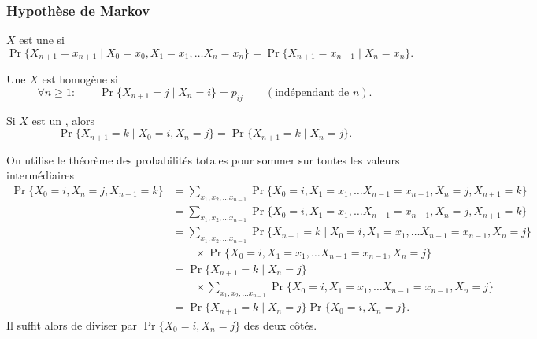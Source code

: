 \subsubsection{Hypothèse de Markov}

\begin{definition}[\CM]
  $X$ est une \cM si
  $$
  \Pr\{X_{n+1} = x_{n+1} \mid X_0 = x_0, X_1 = x_1, \dots X_n = x_n\} 
  = 
  \Pr\{X_{n+1} = x_{n+1} \mid X_n = x_n\}.
  $$
\end{definition}

\begin{definition}[\CM homogène]
  Une \cM $X$ est homogène si
  $$
  \forall n \geq 1: \qquad 
  \Pr\{X_{n+1} = j \mid X_n = i\} = p_{ij} 
  \qquad (\text{indépendant de $n$}).
  $$
\end{definition}

\begin{proposition} \label{prop:loiConditionnalleEtatInitial}
  Si $X$ est un \cM, alors
  $$
  \Pr\{X_{n+1} = k \mid X_0 = i, X_n = j\} 
  = 
  \Pr\{X_{n+1} = k \mid X_n = j\}.
  $$
\end{proposition}

\proof
On utilise le théorème des probabilités totales pour sommer sur toutes les valeurs intermédiaires
  \begin{align*}
    \Pr\{X_0 = i, X_n = j, X_{n+1} = k\}
    & = \sum_{x_1, x_2, \dots x_{n-1}}
    \Pr\{X_0 = i, X_1 = x_1, \dots X_{n-1} = x_{n-1}, X_n = j, X_{n+1} = k\} \\
    & = \sum_{x_1, x_2, \dots x_{n-1}}
    \Pr\{X_0 = i, X_1 = x_1, \dots X_{n-1} = x_{n-1}, X_n = j, X_{n+1} = k\} \\
    & = \sum_{x_1, x_2, \dots x_{n-1}}
    \Pr\{X_{n+1} = k \mid X_0 = i, X_1 = x_1, \dots X_{n-1} = x_{n-1}, X_n = j\} \\
    & \qquad \times \Pr\{X_0 = i, X_1 = x_1, \dots X_{n-1} = x_{n-1}, X_n = j\} \\
    & = \Pr\{X_{n+1} = k \mid X_n = j\} \\
    & \qquad \times \sum_{x_1, x_2, \dots x_{n-1}} \Pr\{X_0 = i, X_1 = x_1, \dots X_{n-1} = x_{n-1}, X_n = j\} \\
    & = \Pr\{X_{n+1} = k \mid X_n = j\} \Pr\{X_0 = i, X_n = j\}.
  \end{align*}
  Il suffit alors de diviser par $\Pr\{X_0 = i, X_n = j\}$ des deux côtés. 
\eproof

